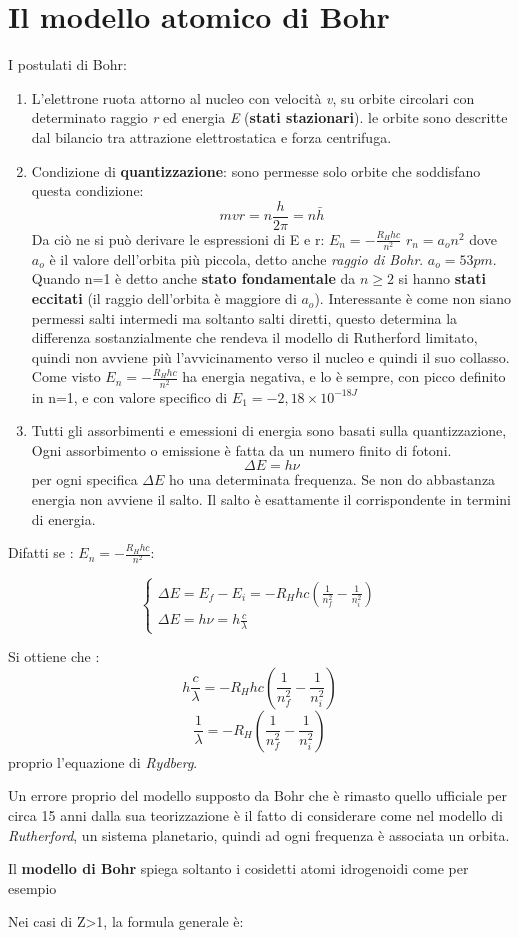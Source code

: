 \section{Il modello atomico di Bohr}
I postulati di Bohr: 
\begin{enumerate}
    \item L'elettrone ruota attorno al nucleo con velocità \emph{v}, su orbite circolari con determinato raggio \emph{r} ed energia \emph{E} (\textbf{stati stazionari}). le orbite sono descritte dal bilancio tra attrazione elettrostatica e forza centrifuga. 
    \item Condizione di \textbf{quantizzazione}: sono permesse solo orbite che soddisfano questa condizione: \[mvr=n\frac{h}{2\pi}=n\bar{h}\]  %
    Da ciò ne si può derivare le espressioni di E e r: 
    $E_n=-\frac{R_Hhc}{n^{2}}$ $r_n=a_on^{2}$ 
    dove $a_o$ è il valore dell'orbita più piccola, detto anche \emph{raggio di Bohr}. $a_o=53pm$. Quando n=1 è detto anche \textbf{stato fondamentale} da $n\ge2$ si hanno \textbf{stati eccitati} (il raggio dell'orbita è maggiore di $a_o$).
    Interessante è come non siano permessi salti intermedi ma soltanto salti diretti, questo determina la differenza sostanzialmente che rendeva il modello di Rutherford limitato, quindi non avviene più l'avvicinamento verso il nucleo e quindi il suo collasso. 
    Come visto $E_n=-\frac{R_Hhc}{n^{2}}$ ha energia negativa, e lo è sempre, con picco definito in n=1, e con valore specifico di $E_1=-2,18\times10^{-18J}$
    \item Tutti gli assorbimenti e emessioni di energia sono basati sulla quantizzazione, Ogni assorbimento o emissione è fatta da un numero finito di fotoni. 
    \[\Delta E=h\nu\] per ogni specifica $\Delta E$ ho una determinata frequenza. Se non do abbastanza energia non avviene il salto. Il salto è esattamente il corrispondente in termini di energia.
\end{enumerate}

Difatti se : $E_n=-\frac{R_Hhc}{n^{2}}$: 

\[
\begin{cases}
    \Delta E = E_f - E_i = -R_Hhc(\frac{1}{n_f^{2}}-\frac{1}{n_i^{2}}) \\
    \Delta E = h\nu = h\frac{c}{\lambda}
\end{cases}
\]

Si ottiene che : 
\[ h\frac{c}{\lambda}=-R_Hhc(\frac{1}{n_f^{2}}-\frac{1}{n_i^{2}})\]
\[\frac{1}{\lambda}=-R_H(\frac{1}{n_f^{2}}-\frac{1}{n_i^{2}})\] 
proprio l'equazione di \emph{Rydberg}. 

Un errore proprio del modello supposto da Bohr che è rimasto quello ufficiale per circa 15 anni dalla sua teorizzazione è il fatto di considerare come nel modello di \emph{Rutherford}, un sistema planetario, quindi ad ogni frequenza è associata un orbita. 

Il \textbf{modello di Bohr} spiega soltanto i cosidetti atomi idrogenoidi come per esempio 

Nei casi di Z>1, la formula generale è: 
\[\]